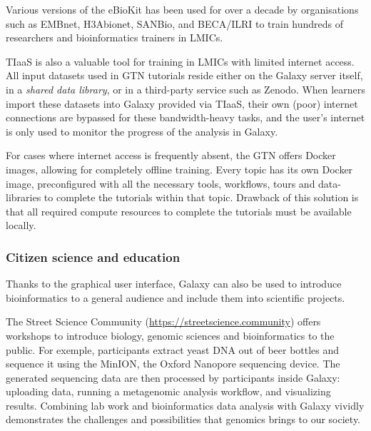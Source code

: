 \documentclass[10pt,letterpaper]{article}
\begin{document}
Various versions of the eBioKit has been used for over a decade by organisations such as EMBnet, H3Abionet, SANBio, and BECA/ILRI to train hundreds of researchers and bioinformatics trainers in LMICs.

TIaaS is also a valuable tool for training in LMICs with limited internet access. All input datasets used in GTN tutorials reside either on the Galaxy server itself, in a \emph{shared data library}, or in a third-party service such as Zenodo. When learners import these datasets into Galaxy provided via TIaaS, their own (poor) internet connections are bypassed for these bandwidth-heavy tasks, and the user's internet is only used to monitor the progress of the analysis in Galaxy. 

For cases where internet access is frequently absent, the GTN offers Docker \cite{Boettiger2015} images, allowing for completely offline training. Every topic has its own Docker image, preconfigured with all the necessary tools, workflows, tours and data-libraries to complete the tutorials within that topic. Drawback of this solution is that all required compute resources to complete the tutorials must be available locally. 


\subsubsection*{Citizen science and education}

Thanks to the graphical user interface, Galaxy can also be used to introduce bioinformatics to a general audience and include them into scientific projects.

The Street Science Community (\url{https://streetscience.community}) offers workshops to introduce biology, genomic sciences and bioinformatics to the public. For exemple, participants extract yeast DNA out of beer bottles and sequence it using the MinION, the Oxford Nanopore sequencing device. The generated sequencing data are then processed by participants inside Galaxy: uploading data, running a metagenomic analysis workflow, and visualizing results. Combining lab work and bioinformatics data analysis with Galaxy vividly demonstrates the challenges and possibilities that genomics brings to our society.
\end{document}
